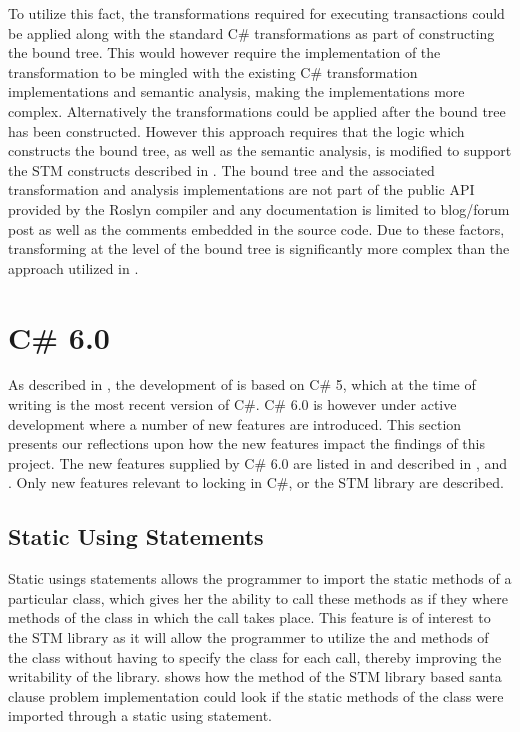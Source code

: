 To utilize this fact, the transformations required for executing transactions could be applied along with the standard C\# transformations as part of constructing the bound tree. This would however require the implementation of the transformation to be mingled with the existing C\# transformation implementations and semantic analysis, making the implementations more complex. Alternatively the transformations could be applied after the bound tree has been constructed. However this approach requires that the logic which constructs the bound tree, as well as the semantic analysis, is modified to support the \ac{STM} constructs described in . The bound tree and the associated transformation and analysis implementations are not part of the public \ac{API} provided by the Roslyn compiler and any documentation is limited to blog/forum post as well as the comments embedded in the source code. Due to these factors, transforming at the level of the bound tree is significantly more complex than the approach utilized in .

\section{C\# 6.0}
As described in , the development of \stmname is based on C\# 5, which at the time of writing is the most recent version of C\#. C\# 6.0 is however under active development where a number of new features are introduced. This section presents our reflections upon how the new features impact the findings of this project. The new features supplied by C\# 6.0 are listed in \cite{csharp6Features} and described in \cite{csharp6one}, \cite{csharp6two} and \cite{csharp6featureDescription}. Only new features relevant to locking in C\#, \stmname or the \ac{STM} library are described. 

\subsection{Static Using Statements}
Static usings statements allows the programmer to import the static methods of a particular class, which gives her the ability to call these methods as if they where methods of the class in which the call takes place\cite{csharp6one}\cite{csharp6featureDescription}. This feature is of interest to the \ac{STM} library as it will allow the programmer to utilize the  and  methods of the  class without having to specify the class for each call, thereby improving the writability of the library.  shows how the  method of the \ac{STM} library based santa clause problem implementation could look if the static methods of the  class were imported through a static using statement.

